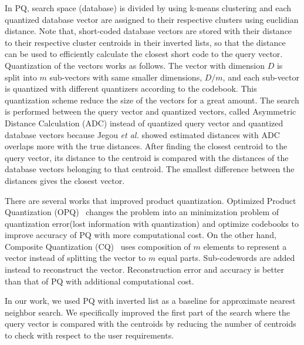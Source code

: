 In PQ, search space (database) is divided by using k-means clustering and each quantized database vector are assigned to their respective clusters using euclidian distance. 
Note that, short-coded database vectors are stored with their distance to their respective cluster centroids in their inverted lists, so that the distance can be used to efficiently calculate the closest short code to the query vector.
Quantization of the vectors works as follows.
The vector with dimension $D$ is split into $m$ sub-vectors with same smaller dimensions, $D/m$, and each sub-vector is quantized with different quantizers according to the codebook. 
This quantization scheme reduce the size of the vectors for a great amount.
The search is performed between the query vector and quantized vectors, called Asymmetric Distance Calculation (ADC) instead of quantized query vector and quantized database vectors because Jegou \emph{et al.} showed estimated distances with ADC overlaps more with the true distances.
After finding the closest centroid to the query vector, its distance to the centroid is compared with the distances of the database vectors belonging to that centroid. 
The smallest difference between the distances gives the closest vector.

There are several works that improved product quantization. Optimized Product Quantization (OPQ)~\cite{ge2013optimized} changes the problem into an minimization problem of quantization error(lost information with quantization) and optimize codebooks to improve accuracy of PQ with more computational cost. 
On the other hand, Composite Quantization (CQ)~\cite{wang2018composite} uses composition of $m$ elements to represent a vector instead of splitting the vector to $m$ equal parts. 
Sub-codewords are added instead to reconstruct the vector. 
Reconstruction error and accuracy is better than that of PQ with additional computational cost.

In our work, we used PQ with inverted list as a baseline for approximate nearest neighbor search. 
We specifically improved the first part of the search where the query vector is compared with the centroids by reducing the number of centroids to check with respect to the user requirements. 

